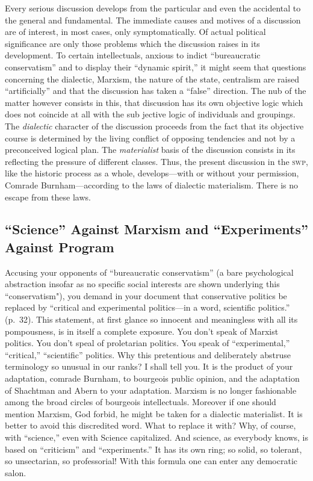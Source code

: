 Every serious discussion develops from the particular and even the accidental to the general and fundamental. The immediate causes and motives of a discussion are of interest, in most cases, only symptomatically. Of actual political significance are only those problems which the discussion raises in its development. To certain intellectuals, anxious to indict ``bureaucratic conservatism” and to display their “dynamic spirit,” it might seem that questions concerning the dialectic, Marxism, the nature of the state, centralism are raised “artificially” and that the discussion has taken a “false” direction. The nub of the matter however consists in this, that discussion has its own objective logic which does not coincide at all with the sub jective logic of individuals and groupings. The \emph{dialectic} character of the discussion proceeds from the fact that its objective course is determined by the living conflict of opposing tendencies and not by a preconceived logical plan. The \emph{materialist} basis of the discussion consists in its reflecting the pressure of different classes. Thus, the present discussion in the \textsc{swp}, like the historic process as a whole, develops---with or without your permission, Comrade Burnham---according to the laws of dialectic materialism. There is no escape from these laws.

\subsection*{“Science” Against Marxism and “Experiments” Against Program}

Accusing your opponents of “bureaucratic conservatism” (a bare psychological abstraction insofar as no specific social interests are shown underlying this “conservatism"), you demand in your document that conservative politics be replaced by “critical and experimental politics---in a word, scientific politics.” (p.~32). This statement, at first glance so innocent and meaningless with all its pompousness, is in itself a complete exposure. You don’t speak of Marxist politics. You don’t speal of proletarian politics. You speak of “experimental,” “critical,” “scientific” politics. Why this pretentious and deliberately abstruse terminology so unusual in our ranks? I shall tell you. It is the product of your adaptation, comrade Burnham, to bourgeois public opinion, and the adaptation of Shachtman and Abern to your adaptation. Marxism is no longer fashionable among the broad circles of bourgeois intellectuals. Moreover if one should mention Marxism, God forbid, he might be taken for a dialectic materialist. It is better to avoid this discredited word. What to replace it with? Why, of course, with “science,” even with Science capitalized. And science, as everybody knows, is based on “criticism” and “experiments.” It has its own ring; so solid, so tolerant, so unsectarian, so professorial! With this formula one can enter any democratic salon.

